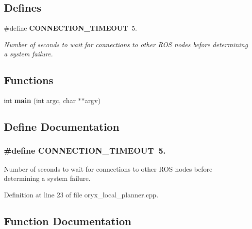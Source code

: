 \subsection*{\-Defines}
\begin{DoxyCompactItemize}
\item 
\#define {\bf \-C\-O\-N\-N\-E\-C\-T\-I\-O\-N\-\_\-\-T\-I\-M\-E\-O\-U\-T}~5.
\begin{DoxyCompactList}\small\item\em \-Number of seconds to wait for connections to other \-R\-O\-S nodes before determining a system failure. \end{DoxyCompactList}\end{DoxyCompactItemize}
\subsection*{\-Functions}
\begin{DoxyCompactItemize}
\item 
int {\bf main} (int argc, char $\ast$$\ast$argv)
\end{DoxyCompactItemize}


\subsection{\-Define \-Documentation}
\subsubsection[{\-C\-O\-N\-N\-E\-C\-T\-I\-O\-N\-\_\-\-T\-I\-M\-E\-O\-U\-T}]{\setlength{\rightskip}{0pt plus 5cm}\#define {\bf \-C\-O\-N\-N\-E\-C\-T\-I\-O\-N\-\_\-\-T\-I\-M\-E\-O\-U\-T}~5.}\label{oryx__local__planner_8cpp_a0c63390af22aa0f877eece67372a7414}


\-Number of seconds to wait for connections to other \-R\-O\-S nodes before determining a system failure. 



\-Definition at line 23 of file oryx\-\_\-local\-\_\-planner.\-cpp.



\subsection{\-Function \-Documentation}
